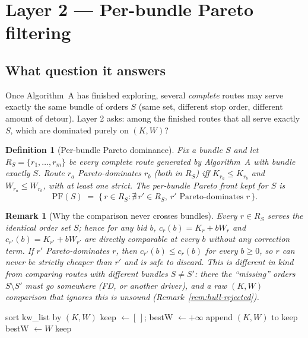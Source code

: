 \documentclass[11pt]{article}
\newtheorem{definition}{Definition}
\newtheorem{remark}{Remark}
\begin{document}
\section{Layer 2 --- Per-bundle Pareto filtering}

\subsection{What question it answers}
Once Algorithm~A has finished exploring, several \emph{complete} routes may serve exactly the
same bundle of orders $S$ (same set, different stop order, different amount of detour). Layer
2 asks: among the finished routes that all serve exactly $S$, which are dominated purely on
$(K,W)$?

\begin{definition}[Per-bundle Pareto dominance]\label{def:layer2}
Fix a bundle $S$ and let $R_S=\{r_1,\dots,r_m\}$ be every complete route generated by
Algorithm~A with bundle exactly $S$. Route $r_a$ \emph{Pareto-dominates} $r_b$ (both in $R_S$)
iff $K_{r_a}\le K_{r_b}$ and $W_{r_a}\le W_{r_b}$, with at least one strict. The
\emph{per-bundle Pareto front} kept for $S$ is
\[
\mathrm{PF}(S) \;=\; \{\, r\in R_S : \nexists\, r'\in R_S,\ r' \text{ Pareto-dominates } r \,\}.
\]
\end{definition}

\begin{remark}[Why the comparison never crosses bundles]
Every $r\in R_S$ serves the \emph{identical} order set $S$; hence for any bid $b$,
$c_r(b)=K_r+bW_r$ and $c_{r'}(b)=K_{r'}+bW_{r'}$ are directly comparable at every $b$ without
any correction term. If $r'$ Pareto-dominates $r$, then $c_{r'}(b)\le c_r(b)$ for \emph{every}
$b\ge0$, so $r$ can never be strictly cheaper than $r'$ and is safe to discard. This is
different in kind from comparing routes with \emph{different} bundles $S\ne S'$: there the
``missing'' orders $S\setminus S'$ must go somewhere (FD, or another driver), and a raw
$(K,W)$ comparison that ignores this is unsound (Remark~\ref{rem:hull-rejected}).
\end{remark}

\begin{algorithm}[H]
\caption{Layer 2 --- Pareto front of one bundle}
\label{alg:layer2}
\begin{algorithmic}[1]
  \State sort kw\_list by $(K,W)$
  \State keep $\gets [\,]$; bestW $\gets +\infty$
     \State append $(K,W)$ to keep \State bestW $\gets W$ \EndIf
  \EndFor
  \State \Return keep
\EndFunction
\end{algorithmic}
\end{algorithm}
\end{document}
